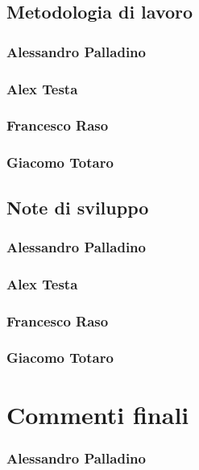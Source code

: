 \documentclass[a4paper,12pt]{report}
\begin{document}
\section{Metodologia di lavoro}
    \subsection*{Alessandro Palladino}
    
    
    \subsection*{Alex Testa}
    
    
    \subsection*{Francesco Raso}
    
    
    \subsection*{Giacomo Totaro}
    
    
\section{Note di sviluppo}
    \subsection*{Alessandro Palladino}
    
    
    \subsection*{Alex Testa}
    
    
    \subsection*{Francesco Raso}
    
    
    \subsection*{Giacomo Totaro}

\chapter{Commenti finali}
    \subsection*{Alessandro Palladino}
    
\end{document}
